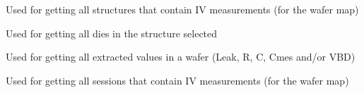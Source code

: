 \documentclass[letterpaper,10pt,english]{sphinxmanual}
\begin{document}

\begin{fulllineitems}
\label{\detokenize{app:app.get_map_structures_server}}
\pysigstartsignatures
{}
\pysigstopsignatures
\sphinxAtStartPar
Used for getting all structures that contain I\sphinxhyphen{}V measurements (for the wafer map)

\end{fulllineitems}


\begin{fulllineitems}
\label{\detokenize{app:app.get_matrices}}
\pysigstartsignatures
{}
\pysigstopsignatures
\sphinxAtStartPar
Used for getting all dies in the structure selected

\end{fulllineitems}


\begin{fulllineitems}
\label{\detokenize{app:app.get_normal_values}}
\pysigstartsignatures
{}
\pysigstopsignatures
\sphinxAtStartPar
Used for getting all extracted values in a wafer (Leak, R, C, Cmes and/or VBD)

\end{fulllineitems}


\begin{fulllineitems}
\label{\detokenize{app:app.get_plot_sessions_server}}
\pysigstartsignatures
{}
\pysigstopsignatures
\sphinxAtStartPar
Used for getting all sessions that contain I\sphinxhyphen{}V measurements (for the wafer map)

\end{fulllineitems}
\end{document}
